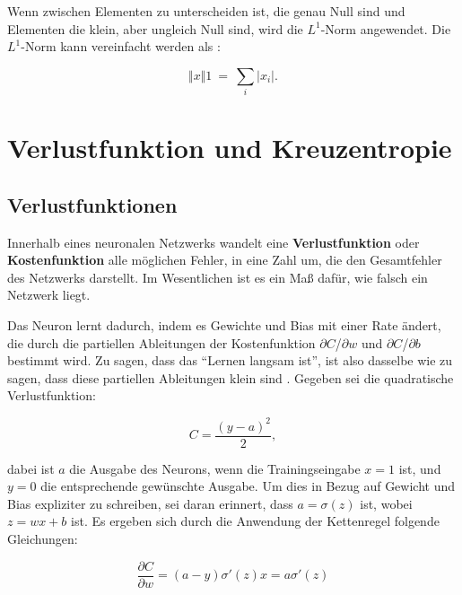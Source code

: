         Wenn zwischen Elementen zu unterscheiden ist, die genau Null sind und Elementen die klein, aber ungleich Null sind, wird die $L^1$-Norm angewendet. Die $L^1$-Norm kann vereinfacht werden als \cite*[40]{IanGoodfellowYoshuaBengio2016}:

        \begin{equation} \label{FormelNorm1}
            \Vert x\Vert 1\ =\ \sum _{i}\bigr| x_{i}\bigr|.
        \end{equation}


        \section{Verlustfunktion und Kreuzentropie}
        \subsection{Verlustfunktionen}
        Innerhalb eines neuronalen Netzwerks wandelt eine \textbf{Verlustfunktion} oder \textbf{Kostenfunktion} alle möglichen Fehler, in eine Zahl um, die den Gesamtfehler des Netzwerks darstellt. Im Wesentlichen ist es ein Maß dafür, wie falsch ein Netzwerk liegt.

        Das Neuron lernt dadurch, indem es Gewichte und Bias mit einer Rate ändert, die durch die partiellen Ableitungen der Kostenfunktion $\partial$$C$/$\partial$$w$ und $\partial$$C$/$\partial$$b$ bestimmt wird. Zu sagen, dass das \enquote{Lernen langsam ist}, ist also dasselbe wie zu sagen, dass diese partiellen Ableitungen klein sind \cite*[61]{Nielsen2015}. Gegeben sei die quadratische Verlustfunktion:

        \begin{equation} \label{Formel2_5}
            C=\frac{( y-a)^{2}}{2},
        \end{equation}

        dabei ist $a$ die Ausgabe des Neurons, wenn die Trainingseingabe $x = 1$ ist, und $y = 0$ die entsprechende gewünschte Ausgabe. Um dies in Bezug auf Gewicht und Bias expliziter zu schreiben, sei daran erinnert, dass $a = \sigma(z)$ ist, wobei $z = wx + b$ ist. Es ergeben sich durch die Anwendung der Kettenregel folgende Gleichungen:

        \begin{equation} \label{Formel2_6}
            \frac{\partial C}{\partial w} =( a-y) \sigma '( z) x=a\sigma '( z)
        \end{equation}

